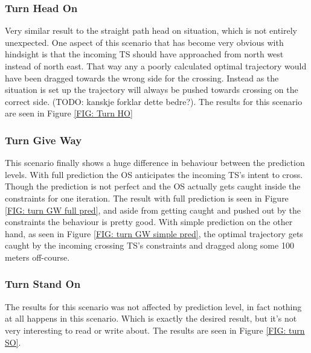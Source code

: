\clearpage
\subsubsection{Turn Head On}
Very similar result to the straight path head on situation, which is not entirely unexpected. One aspect of this scenario that
has become very obvious with hindsight is that the incoming TS should have approached from north west instead of north east. That way
any a poorly calculated optimal trajectory would have been dragged towards the wrong side for the crossing. Instead as the situation is set
up the trajectory will always be pushed towards crossing on the correct side. (TODO: kanskje forklar dette bedre?).
The results for this scenario are seen in Figure \ref{FIG: Turn HO}

\subsubsection{Turn Give Way}
This scenario finally shows a huge difference in behaviour between the prediction levels. With full prediction the OS
anticipates the incoming TS's intent to cross. Though the prediction is not perfect and the OS actually gets caught inside the
constraints for one iteration. The result with full prediction is seen in Figure \ref{FIG: turn GW full pred}, and aside from
getting caught and pushed out by the constraints the behaviour is pretty good.
With simple prediction on the other hand, as seen in Figure \ref{FIG: turn GW simple pred}, the optimal trajectory gets caught by the
incoming crossing TS's constraints and dragged along some 100 meters off-course.

\subsubsection{Turn Stand On}
The results for this scenario was not affected by prediction level, in fact nothing at all happens in this scenario. Which is exactly the desired result,
but it's not very interesting to read or write about. The results are seen in Figure \ref{FIG: turn SO}.

